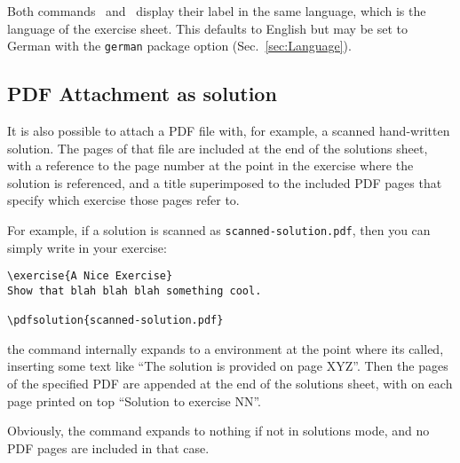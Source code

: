 \documentclass[11pt,a4paper]{article}
\begin{document}

\begin{pkgnotice}
  Both commands~ and~ display their label in the same
  language, which is the language of the exercise sheet. This defaults to English but may
  be set to German with the {\tt german} package option (Sec.~\ref{sec:Language}).
\end{pkgnotice}




\subsection{PDF Attachment as solution}

It is also possible to attach a PDF file with, for example, a scanned hand-written
solution. The pages of that file are included at the end of the solutions sheet, with a
reference to the page number at the point in the exercise where the solution is
referenced, and a title superimposed to the included PDF pages that specify which exercise
those pages refer to.

For example, if a solution is scanned as \texttt{scanned-solution.pdf}, then you can
simply write in your exercise:
\begin{pkgverbatim}
\begin{verbatim}
\exercise{A Nice Exercise}
Show that blah blah blah something cool.

\pdfsolution{scanned-solution.pdf}

\end{verbatim}
\end{pkgverbatim}

the  command internally expands to a  environment
at the point where its called, inserting some text like ``The solution is provided on page
XYZ''. Then the pages of the specified PDF are appended at the end of the solutions sheet,
with on each page printed on top ``Solution to exercise NN''.

Obviously, the command expands to nothing if not in solutions mode, and no PDF pages are
included in that case.
\end{document}
